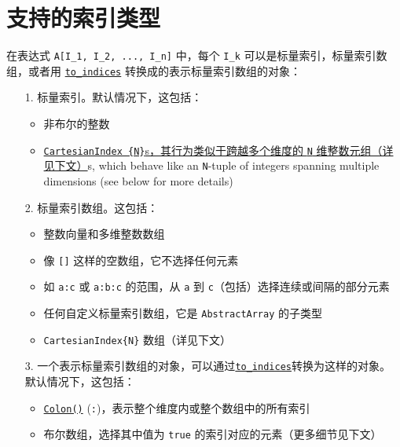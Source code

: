 \hypertarget{982887983034702059}{}


\section{支持的索引类型}



在表达式 \texttt{A[I\_1, I\_2, ..., I\_n]} 中，每个 \texttt{I\_k} 可以是标量索引，标量索引数组，或者用 \hyperlink{10027537986402266830}{\texttt{to\_indices}} 转换成的表示标量索引数组的对象：



\begin{itemize}
\item[1. ] 标量索引。默认情况下，这包括：

\begin{itemize}
\item 非布尔的整数


\item \href{@ref}{\href{@ref}{\texttt{CartesianIndex \{N\}}}s，其行为类似于跨越多个维度的 \texttt{N} 维整数元组（详见下文）}s, which behave like an \texttt{N}-tuple of integers spanning multiple dimensions (see below for more details)

\end{itemize}

\item[2. ] 标量索引数组。这包括：

\begin{itemize}
\item 整数向量和多维整数数组


\item 像 \texttt{[]} 这样的空数组，它不选择任何元素


\item 如 \texttt{a:c} 或 \texttt{a:b:c} 的范围，从 \texttt{a} 到 \texttt{c}（包括）选择连续或间隔的部分元素


\item 任何自定义标量索引数组，它是 \texttt{AbstractArray} 的子类型


\item \texttt{CartesianIndex\{N\}} 数组（详见下文）

\end{itemize}

\item[3. ] 一个表示标量索引数组的对象，可以通过\hyperlink{10027537986402266830}{\texttt{to\_indices}}转换为这样的对象。 默认情况下，这包括：

\begin{itemize}
\item \hyperlink{13649361117037263099}{\texttt{Colon()}} (\texttt{:})，表示整个维度内或整个数组中的所有索引


\item 布尔数组，选择其中值为 \texttt{true} 的索引对应的元素（更多细节见下文）

\end{itemize}
\end{itemize}


